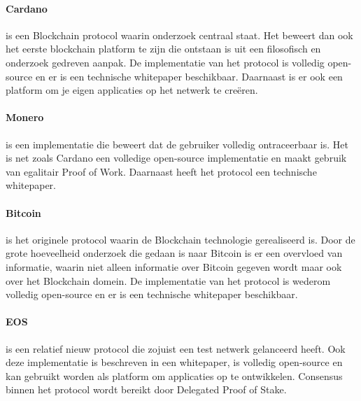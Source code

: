 \paragraph{Cardano} is een Blockchain protocol waarin onderzoek centraal staat. Het beweert dan ook het eerste blockchain platform te zijn die ontstaan is uit een filosofisch en onderzoek gedreven aanpak. De implementatie van het protocol is volledig open-source en er is een technische whitepaper beschikbaar. Daarnaast is er ook een platform om je eigen applicaties op het netwerk te creëren.

\paragraph{Monero} is een implementatie die beweert dat de gebruiker volledig ontraceerbaar is. Het is net zoals Cardano een volledige open-source implementatie en maakt gebruik van egalitair Proof of Work. Daarnaast heeft het protocol een technische whitepaper. 

\paragraph{Bitcoin} is het originele protocol waarin de Blockchain technologie gerealiseerd is. Door de grote hoeveelheid onderzoek die gedaan is naar Bitcoin is er een overvloed van informatie, waarin niet alleen informatie over Bitcoin gegeven wordt maar ook over het Blockchain domein. De implementatie van het protocol is wederom volledig open-source en er is een technische whitepaper beschikbaar.

\paragraph{EOS} is een relatief nieuw protocol die zojuist een test netwerk gelanceerd heeft. Ook deze implementatie is beschreven in een whitepaper, is volledig open-source en kan gebruikt worden als platform om applicaties op te ontwikkelen. Consensus binnen het protocol wordt bereikt door Delegated Proof of Stake.
